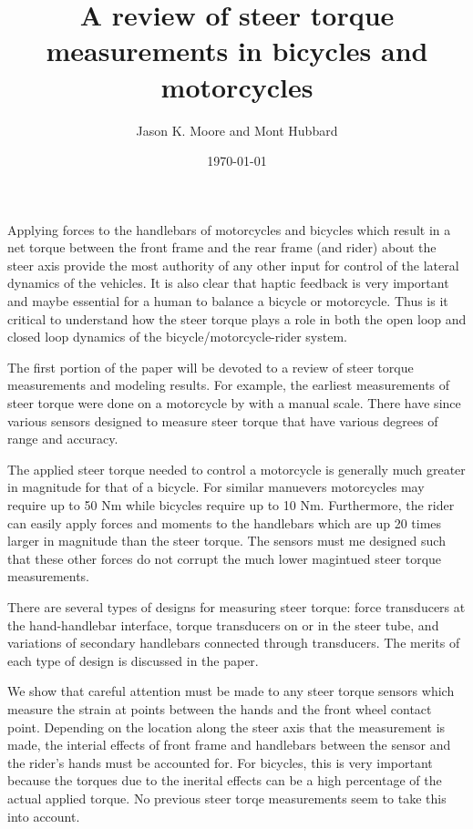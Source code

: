 \documentclass{article}
\title{A review of steer torque measurements in bicycles and motorcycles}
\author{Jason K. Moore and Mont Hubbard}
\date{\today}
\begin{document}
\maketitle

Applying forces to the handlebars of motorcycles and bicycles which result in a
net torque between the front frame and the rear frame (and rider) about the
steer axis provide the most authority of any other input for control of the
lateral dynamics of the vehicles. It is also clear that haptic feedback is very
important and maybe essential for a human to balance a bicycle or motorcycle.
Thus is it critical to understand how the steer torque plays a role in both the
open loop and closed loop dynamics of the bicycle/motorcycle-rider system.

The first portion of the paper will be devoted to a review of steer torque
measurements and modeling results. For example, the earliest measurements of
steer torque were done on a motorcycle by \cite{Wilson-Jones1951} with a manual
scale. There have since various sensors designed to measure steer torque that
have various degrees of range and accuracy.

The applied steer torque needed to control a motorcycle is generally much
greater in magnitude for that of a bicycle. For similar manuevers motorcycles
may require up to 50 Nm while bicycles require up to 10 Nm. Furthermore, the
rider can easily apply forces and moments to the handlebars which are up 20
times larger in magnitude than the steer torque. The sensors must me designed
such that these other forces do not corrupt the much lower magintued steer
torque measurements.

There are several types of designs for measuring steer torque: force
transducers at the hand-handlebar interface, torque transducers on or in the
steer tube, and variations of secondary handlebars connected through
transducers. The merits of each type of design is discussed in the paper.

We show that careful attention must be made to any steer torque sensors which
measure the strain at points between the hands and the front wheel contact point.
Depending on the location along the steer axis that the measurement is made,
the interial effects of front frame and handlebars between the sensor and the
rider's hands must be accounted for. For bicycles, this is very important
because the torques due to the inerital effects can be a high percentage of the
actual applied torque. No previous steer torqe measurements seem to take this
into account.
\end{document}
